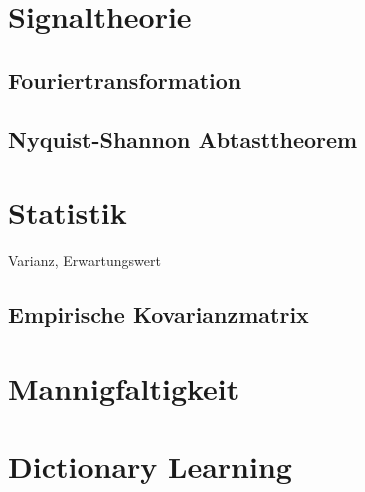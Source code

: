 \section{Signaltheorie}

\subsection{Fouriertransformation}
\subsection{Nyquist-Shannon Abtasttheorem}

\section{Statistik}
Varianz, Erwartungswert
\subsection{Empirische Kovarianzmatrix}

\section{Mannigfaltigkeit}

\section{Dictionary Learning}